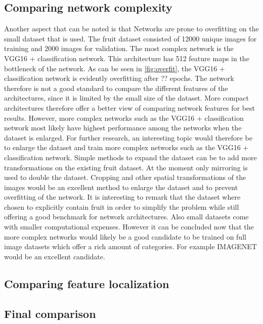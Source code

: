 \subsection{Comparing network complexity}
Another aspect that can be noted is that Networks are prone to overfitting on the small dataset that is used. The fruit dataset consisted of 12000 unique images for training and 2000 images for validation. The most complex network is the VGG16 + classification network. This architecture has 512 feature maps in the bottleneck of the network. As can be seen in \ref{fig:overfit}, the VGG16 + classification network is evidently overfitting after ?? epochs. The network therefore is not a good standard to compare the different features of the architectures, since it is limited by the small size of the dataset. More compact architectures therefore offer a better view of comparing network features for best results. However, more complex networks such as the VGG16 + classification network most likely have highest performance among the networks when the dataset is enlarged. For further research, an interesting topic would therefore be to enlarge the dataset and train more complex networks such as the  VGG16 + classification network. Simple methods to expand the dataset can be to add more transformations on the existing fruit dataset. At the moment only mirroring is used to double the dataset. Cropping and other spatial transformations of the images would be an excellent method to enlarge the dataset and to prevent overfitting of the network. It is interesting to remark that the dataset where chosen to explicitly contain fruit in order to simplify the problem while still offering a good benchmark for network architectures. Also small datasets come with smaller computational expenses. However it can be concluded now that the more complex networks would likely be a good candidate to be trained on full image datasets which offer a rich amount of categories. For example IMAGENET \cite{deng2009imagenet} would be an excellent candidate.
\subsection{Comparing feature localization}

\subsection{Final comparison}









